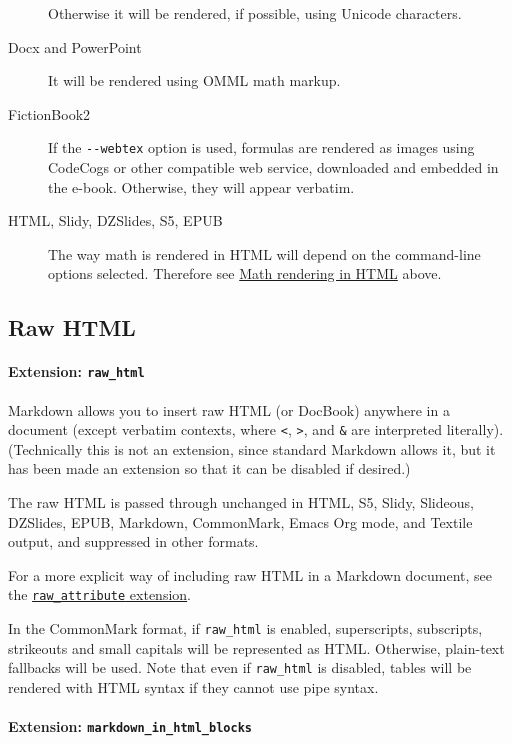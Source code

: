 \begin{description}
Otherwise it will be rendered, if possible, using Unicode characters.
\item[Docx and PowerPoint]
It will be rendered using OMML math markup.
\item[FictionBook2]
If the \texttt{-\/-webtex} option is used, formulas are rendered as
images using CodeCogs or other compatible web service, downloaded and
embedded in the e-book. Otherwise, they will appear verbatim.
\item[HTML, Slidy, DZSlides, S5, EPUB]
The way math is rendered in HTML will depend on the command-line options
selected. Therefore see
\protect\hyperlink{math-rendering-in-html-1}{Math rendering in HTML}
above.
\end{description}

\hypertarget{raw-html}{%
\subsection{Raw HTML}\label{raw-html}}

\hypertarget{extension-raw_html}{%
\paragraph{\texorpdfstring{Extension:
\texttt{raw\_html}}{Extension: raw\_html}}\label{extension-raw_html}}

Markdown allows you to insert raw HTML (or DocBook) anywhere in a
document (except verbatim contexts, where \texttt{\textless{}},
\texttt{\textgreater{}}, and \texttt{\&} are interpreted literally).
(Technically this is not an extension, since standard Markdown allows
it, but it has been made an extension so that it can be disabled if
desired.)

The raw HTML is passed through unchanged in HTML, S5, Slidy, Slideous,
DZSlides, EPUB, Markdown, CommonMark, Emacs Org mode, and Textile
output, and suppressed in other formats.

For a more explicit way of including raw HTML in a Markdown document,
see the
\protect\hyperlink{extension-raw_attribute}{\texttt{raw\_attribute}
extension}.

In the CommonMark format, if \texttt{raw\_html} is enabled,
superscripts, subscripts, strikeouts and small capitals will be
represented as HTML. Otherwise, plain-text fallbacks will be used. Note
that even if \texttt{raw\_html} is disabled, tables will be rendered
with HTML syntax if they cannot use pipe syntax.

\hypertarget{extension-markdown_in_html_blocks}{%
\paragraph{\texorpdfstring{Extension:
\texttt{markdown\_in\_html\_blocks}}{Extension: markdown\_in\_html\_blocks}}\label{extension-markdown_in_html_blocks}}

